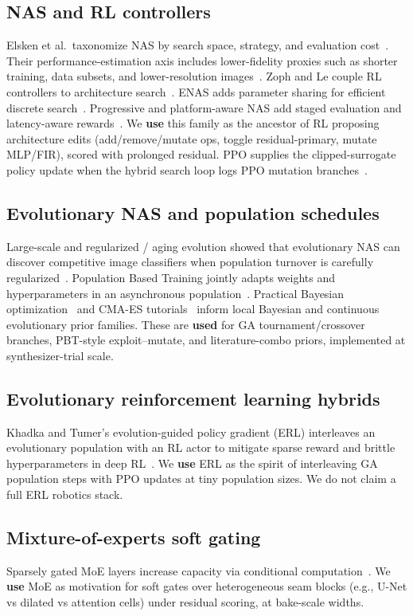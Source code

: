 \subsection{NAS and RL controllers}
Elsken et al.\ taxonomize NAS by search space, strategy, and evaluation cost~\cite{elsken2019}.
Their performance-estimation axis includes lower-fidelity proxies such as shorter training, data subsets, and lower-resolution images~\cite{elsken2019}.
Zoph and Le couple RL controllers to architecture search~\cite{zoph2017nas}.
ENAS adds parameter sharing for efficient discrete search~\cite{pham2018}.
Progressive and platform-aware NAS add staged evaluation and latency-aware rewards~\cite{liu2018pnas,tan2019mnasnet}.
We \textbf{use} this family as the ancestor of RL proposing architecture edits (add/remove/mutate ops, toggle residual-primary, mutate MLP/FIR), scored with prolonged residual.
PPO supplies the clipped-surrogate policy update when the hybrid search loop logs PPO mutation branches~\cite{schulman2017}.

\subsection{Evolutionary NAS and population schedules}
Large-scale and regularized / aging evolution showed that evolutionary NAS can discover competitive image classifiers when population turnover is carefully regularized~\cite{real2017large,real2019}.
Population Based Training jointly adapts weights and hyperparameters in an asynchronous population~\cite{jaderberg2017}.
Practical Bayesian optimization~\cite{snoek2012} and CMA-ES tutorials~\cite{hansen2016cmaes} inform local Bayesian and continuous evolutionary prior families.
These are \textbf{used} for GA tournament/crossover branches, PBT-style exploit--mutate, and literature-combo priors, implemented at synthesizer-trial scale.

\subsection{Evolutionary reinforcement learning hybrids}
Khadka and Tumer's evolution-guided policy gradient (ERL) interleaves an evolutionary population with an RL actor to mitigate sparse reward and brittle hyperparameters in deep RL~\cite{khadka2018}.
We \textbf{use} ERL as the spirit of interleaving GA population steps with PPO updates at tiny population sizes.
We do not claim a full ERL robotics stack.

\subsection{Mixture-of-experts soft gating}
Sparsely gated MoE layers increase capacity via conditional computation~\cite{shazeer2017}.
We \textbf{use} MoE as motivation for soft gates over heterogeneous seam blocks (e.g., U-Net vs dilated vs attention cells) under residual scoring, at bake-scale widths.

